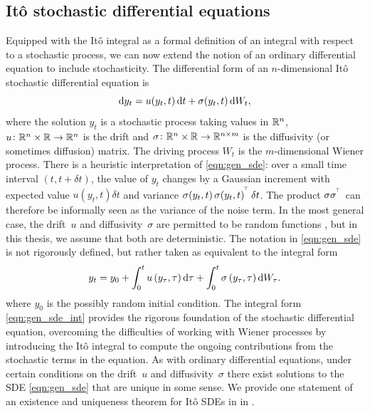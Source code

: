 \subsection{It\^o stochastic differential equations}\label{sec:bkg_sde}
Equipped with the It\^o integral as a formal definition of an integral with respect to a stochastic process, we can now extend the notion of an ordinary differential equation to include stochasticity.
The differential form of an \(n\)-dimensional It\^o stochastic differential equation is
\begin{equation}
	\dif y_t = u\!\left(y_t, t\right)\dif t + \sigma\!\left(y_t, t\right)\dif W_t,
	\label{eqn:gen_sde}
\end{equation}
where the solution \(y_t\) is a stochastic process taking values in \(\mathbb{R}^n\), \(u\colon \mathbb{R}^n \times \mathbb{R} \to \mathbb{R}^n\) is the drift and \(\sigma\colon \mathbb{R}^n \times \mathbb{R} \to \mathbb{R}^{n\times m}\) is the diffusivity (or sometimes diffusion) matrix.
The driving process \(W_t\) is the \(m\)-dimensional Wiener process.
There is a heuristic interpretation of \cref{eqn:gen_sde}: over a small time interval \(\left(t, t + \delta t\right)\), the value of \(y_t\) changes by a Gaussian increment with expected value \(u\!\left(y_t, t\right)\delta t\) and variance \(\sigma\!\left(y_t, t\right)\sigma\!\left(y_t, t\right)^{^{\!\top}}\delta t\).
The product \(\sigma\sigma^{^{\!\top}}\) can therefore be informally seen as the variance of the noise term.
In the most general case, the drift~\(u\) and diffusivity~\(\sigma\) are permitted to be random functions \citep{KallianpurSundar_2014_StochasticAnalysisDiffusion}, but in this thesis, we assume that both are deterministic.
The notation in \cref{eqn:gen_sde} is not rigorously defined, but rather taken as equivalent to the integral form
\begin{equation}\label{eqn:gen_sde_int}
	y_t = y_0 + \int_0^t{u\left(y_\tau, \tau\right)\dif\tau} + \int_0^t{\sigma\left(y_\tau, \tau\right)\dif W_\tau}.
\end{equation}
where \(y_0\) is the possibly random initial condition.
The integral form \cref{eqn:gen_sde_int} provides the rigorous foundation of the stochastic differential equation, overcoming the difficulties of working with Wiener processes by introducing the It\^o integral to compute the ongoing contributions from the stochastic terms in the equation.
As with ordinary differential equations, under certain conditions on the drift~\(u\) and diffusivity~\(\sigma\) there exist solutions to the SDE \cref{eqn:gen_sde} that are unique in some sense.
We provide one statement of an existence and uniqueness theorem for It\^o SDEs in  in .

